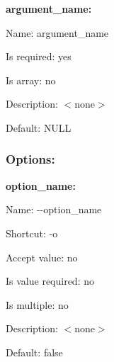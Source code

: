 {\bfseries argument\+\_\+name\+:}


\begin{DoxyItemize}
\item Name\+: argument\+\_\+name
\item Is required\+: yes
\item Is array\+: no
\item Description\+: $<$none$>$
\item Default\+: {\ttfamily N\+U\+L\+L}
\end{DoxyItemize}

\subsubsection*{Options\+:}

{\bfseries option\+\_\+name\+:}


\begin{DoxyItemize}
\item Name\+: {\ttfamily -\/-\/option\+\_\+name}
\item Shortcut\+: {\ttfamily -\/o}
\item Accept value\+: no
\item Is value required\+: no
\item Is multiple\+: no
\item Description\+: $<$none$>$
\item Default\+: {\ttfamily false} 
\end{DoxyItemize}
